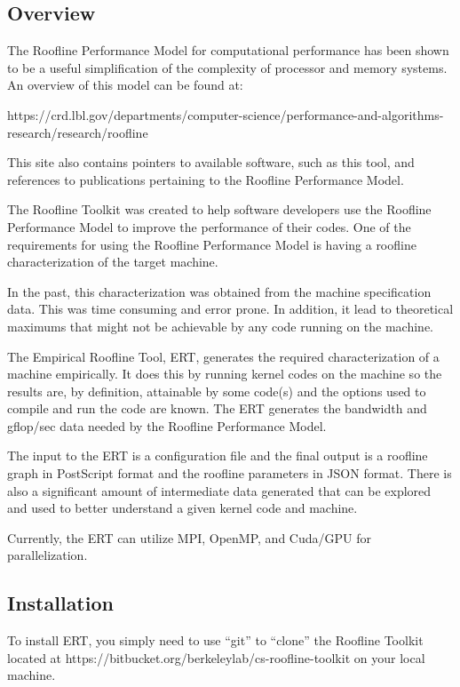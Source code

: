 \subsection{Overview}

The Roofline Performance Model for computational performance has been shown
to be a useful simplification of the complexity of processor and memory
systems.  An overview of this model can be found at:

https:\+//crd.lbl.gov/\+departments/\+computer-science/\+performance-and-al\+go\+rith\+ms-research/\+research/\+roofline

This site also contains pointers to available software, such as this tool, and
references to publications pertaining to the Roofline Performance Model.

The Roofline Toolkit was created to help software developers use the Roofline
Performance Model to improve the performance of their codes.  One of the
requirements for using the Roofline Performance Model is having a roofline
characterization of the target machine.

In the past, this characterization was obtained from the machine
specification data.  This was time consuming and error prone.  In addition, it
lead to theoretical maximums that might not be achievable by any code running
on the machine.

The Empirical Roofline Tool, ERT, generates the required characterization of a
machine empirically.  It does this by running kernel codes on the machine so
the results are, by definition, attainable by some code(s) and the options
used to compile and run the code are known.  The ERT generates the bandwidth
and gflop/sec data needed by the Roofline Performance Model.

The input to the ERT is a configuration file and the final output is a
roofline graph in PostScript format and the roofline parameters in JSON
format.  There is also a significant amount of intermediate data generated
that can be explored and used to better understand a given kernel code and
machine.

Currently, the ERT can utilize MPI, OpenMP, and Cuda/GPU for parallelization.

\subsection{Installation}

To install ERT, you simply need to use ``git'' to ``clone'' the Roofline
Toolkit located at https:\+//bitbucket.org/\+berkeleylab/\+cs-roofline-toolkit
on your local machine.

